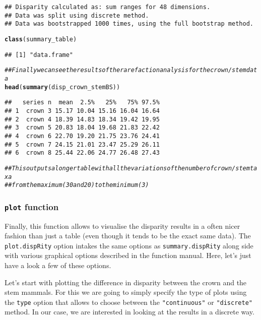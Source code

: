 \documentclass{article}\usepackage[]{graphicx}\usepackage[]{color}
\makeatletter
\newcommand{\hlcom}[1]{\textcolor[rgb]{0.678,0.584,0.686}{\textit{#1}}}%
\newcommand{\hlstd}[1]{\textcolor[rgb]{0.345,0.345,0.345}{#1}}%
\newcommand{\hlkwd}[1]{\textcolor[rgb]{0.737,0.353,0.396}{\textbf{#1}}}%
\newenvironment{kframe}{%
 \def\at@end@of@kframe{}%
 \ifinner\ifhmode%
  \def\at@end@of@kframe{\end{minipage}}%
  \begin{minipage}{\columnwidth}%
 \fi\fi%
 \def\FrameCommand##1{\hskip\@totalleftmargin \hskip-\fboxsep
 \colorbox{shadecolor}{##1}\hskip-\fboxsep
     \hskip-\linewidth \hskip-\@totalleftmargin \hskip\columnwidth}%
 \MakeFramed {\advance\hsize-\width
   \@totalleftmargin\z@ \linewidth\hsize
   \@setminipage}}%
 {\par\unskip\endMakeFramed%
 \at@end@of@kframe}
\newenvironment{knitrout}{}{} %
\makeatother
\begin{document}
\begin{knitrout}
\begin{kframe}
\begin{verbatim}
## Disparity calculated as: sum ranges for 48 dimensions.
## Data was split using discrete method.
## Data was bootstrapped 1000 times, using the full bootstrap method.
\end{verbatim}
\begin{alltt}
\hlkwd{class}\hlstd{(summary_table)}
\end{alltt}
\begin{verbatim}
## [1] "data.frame"
\end{verbatim}
\begin{alltt}
\hlcom{## Finally we can see the results of the rarefaction analysis for the crown/stem data}
\hlkwd{head}\hlstd{(}\hlkwd{summary}\hlstd{(disp_crown_stemBS))}
\end{alltt}
\begin{verbatim}
##   series n  mean  2.5%   25%   75% 97.5%
## 1  crown 3 15.17 10.04 15.16 16.04 16.64
## 2  crown 4 18.39 14.83 18.34 19.42 19.95
## 3  crown 5 20.83 18.04 19.68 21.83 22.42
## 4  crown 6 22.70 19.20 21.75 23.76 24.41
## 5  crown 7 24.15 21.01 23.47 25.29 26.11
## 6  crown 8 25.44 22.06 24.77 26.48 27.43
\end{verbatim}
\begin{alltt}
\hlcom{## This outputs a longer table with all the variations of the number of crown/stem taxa}
\hlcom{## from the maximum (30 and 20) to the minimum (3)}
\end{alltt}
\end{kframe}
\end{knitrout}

\subsubsection{\texttt{plot} function}
Finally, this function allows to visualise the disparity results in a often nicer fashion than just a table (even though it tends to be the exact same data).
The \texttt{plot.dispRity} option intakes the same options as \texttt{summary.dispRity} along side with various graphical options described in the function manual.
Here, let's just have a look a few of these options.

Let's start with plotting the difference in disparity between the crown and the stem mammals.
For this we are going to simply specify the type of plots using the \texttt{type} option that allows to choose between the \texttt{"continuous"} or \texttt{"discrete"} method.
In our case, we are interested in looking at the results in a discrete way.
\end{document}
